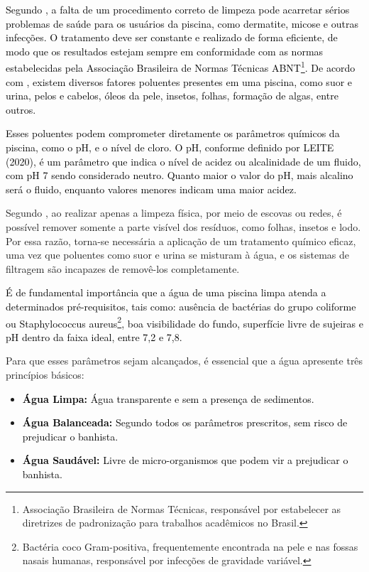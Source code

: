        \textcolor{black}{Segundo \cite{piscineiroProfissional}, a falta de um procedimento correto de limpeza pode acarretar sérios problemas de saúde para os usuários da piscina, como dermatite, micose e outras infecções. O tratamento deve ser constante e realizado de forma eficiente, de modo que os resultados estejam sempre em conformidade com as normas estabelecidas pela Associação Brasileira de Normas Técnicas ABNT\footnote{Associação Brasileira de Normas Técnicas, responsável por estabelecer as diretrizes de padronização para trabalhos acadêmicos no Brasil.}. De acordo com \cite{guiaTratamento}, existem diversos fatores poluentes presentes em uma piscina, como suor e urina, pelos e cabelos, óleos da pele, insetos, folhas, formação de algas, entre outros.}

       \textcolor{black}{Esses poluentes podem comprometer diretamente os parâmetros químicos da piscina, como o pH, e o nível de cloro. O pH, conforme definido por LEITE (2020), é um parâmetro que indica o nível de acidez ou alcalinidade de um fluido, com pH 7 sendo considerado neutro. Quanto maior o valor do pH, mais alcalino será o fluido, enquanto valores menores indicam uma maior acidez.}

       Segundo \cite{guiaTratamento}, ao realizar apenas a limpeza física, por meio de escovas ou redes, é possível remover somente a parte visível dos resíduos, como folhas, insetos e lodo. Por essa razão, torna-se necessária a aplicação de um tratamento químico eficaz, uma vez que poluentes como suor e urina se misturam à água, e os sistemas de filtragem são incapazes de removê-los completamente.


       \textcolor{black}{É de fundamental importância que a água de uma piscina limpa atenda a determinados pré-requisitos, tais como: ausência de bactérias do grupo coliforme ou Staphylococcus aureus\footnote{Bactéria coco Gram-positiva, frequentemente encontrada na pele e nas fossas nasais humanas, responsável por infecções de gravidade variável.}, boa visibilidade do fundo, superfície livre de sujeiras e pH dentro da faixa ideal, entre 7,2 e 7,8.}

       Para que esses parâmetros sejam alcançados, é essencial que a água apresente três princípios básicos:
    
       \begin{itemize}
            \item \textbf{\textcolor{black}{Água Limpa:}} \textcolor{black}{Água transparente e sem a presença de sedimentos.}
            
            \item \textbf{\textcolor{black}{Água Balanceada:}} \textcolor{black}{Segundo todos os parâmetros prescritos, sem risco de prejudicar o banhista.}
             
            \item \textbf{\textcolor{black}{Água Saudável:}} \textcolor{black}{Livre de micro-organismos que podem vir a prejudicar o banhista.}
            
        \end{itemize}


